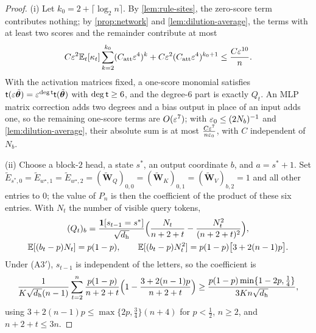 \begin{proof}
(i) Let $k_0=2+\lceil\log_2n\rceil$. By \cref{lem:rule-sites}, the zero-score term contributes nothing; by \cref{prop:network} and
\cref{lem:dilution-average}, the terms with at least two scores and the remainder contribute at most
\[
 C\varepsilon^2\mathbb E_t[\kappa_t]\sum_{k=2}^{k_0}(C_{\mathrm{att}}\varepsilon^4)^k+C\varepsilon^2(C_{\mathrm{att}}\varepsilon^4)^{k_0+1}\le\frac{C\varepsilon^{10}}{n} .
\]
With the activation matrices fixed, a one-score monomial satisfies $\mathsf t(\varepsilon\tilde{\bm\theta})=\varepsilon^{\deg\mathsf t}\mathsf t(\tilde{\bm\theta})$ with $\deg\mathsf t\ge6$, and the
degree-$6$ part is exactly $Q_t$. An MLP matrix correction adds two degrees and a bias output in place of an input adds one, so the
remaining one-score terms are $O(\varepsilon^7)$; with $\varepsilon_0\le(2N_b)^{-1}$ and \cref{lem:dilution-average}, their absolute sum is at most
$\frac{C\varepsilon^7}{n\varepsilon_0}$, with $C$ independent of $N_b$.

(ii) Choose a block-$2$ head, a state $s^\ast$, an output coordinate $b$, and $a=s^\ast+1$. Set
$\tilde E_{s^\ast,0}=\tilde E_{w^\star,1}=\tilde E_{w^\star,2}=(\tilde{\mathbf W}_Q)_{0,0}=(\tilde{\mathbf W}_K)_{0,1}=(\tilde{\mathbf W}_V)_{b,2}=1$ and all other entries to $0$; the value of $P_n$ is then the
coefficient of the product of these six entries. With $N_t$ the number of visible query tokens,
\begin{gather*}
 (Q_t)_b=\frac{\mathbf 1[s_{t-1}=s^\ast]}{\sqrt{d_{\mathrm h}}}\Bigl(\frac{N_t}{n+2+t}-\frac{N_t^2}{(n+2+t)^2}\Bigr),\\
 \mathbb E[(b_t-p)N_t]=p(1-p),\qquad \mathbb E[(b_t-p)N_t^2]=p(1-p)\bigl[3+2(n-1)p\bigr].
\end{gather*}
Under (A3$'$), $s_{t-1}$ is independent of the letters, so the coefficient is
\[
 \frac{1}{K\sqrt{d_{\mathrm h}}(n-1)}\sum_{t=2}^n\frac{p(1-p)}{n+2+t}\Bigl(1-\frac{3+2(n-1)p}{n+2+t}\Bigr)
 \ge\frac{p(1-p)\min\{1-2p,\frac{1}{4}\}}{3Kn\sqrt{d_{\mathrm h}}},
\]
using $3+2(n-1)p\le\max\{2p,\frac{3}{4}\}(n+4)$ for $p<\frac{1}{2}$, $n\ge2$, and $n+2+t\le3n$.
\end{proof}

